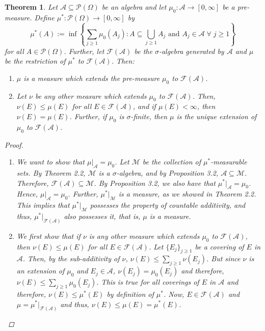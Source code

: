 \documentclass{article}
\newcommand{\A}{\mathscr{A}}
\newcommand{\Po}{\mathscr{P}}
\newcommand{\F}{\mathscr{F}}
\newcommand{\M}{\mathcal{M}}
\theoremstyle{spaced}
\newtheorem{theorem}{Theorem}[section]
\begin{document}
\begin{theorem}
    Let $\A \subseteq \Po(\Omega)$ be an algebra and let $\mu_0: \A \to [0, \infty]$ be a pre-measure. Define $\mu^*: \Po(\Omega) \to [0, \infty]$ by
    \begin{equation*}
        \mu^*(A) := \inf\left\{ \sum_{j\geq 1} \mu_0(A_j) : A \subseteq \bigcup_{j \geq 1} A_j \text{ and } A_j \in \A \; \forall \; j \geq 1 \right\}
    \end{equation*}
    for all $A \in \Po(\Omega)$. Further, let $\F(\A)$ be the $\sigma$-algebra generated by $\A$ and $\mu$ be the restriction of $\mu^*$ to $\F(\A)$. Then:
    \begin{enumerate}
        \item $\mu$ is a measure which extends the pre-measure $\mu_0$ to $\F(\A)$.
        \item Let $\nu$ be any other measure which extends $\mu_0$ to $\F(\A)$. Then, $\nu(E) \leq \mu(E)$ for all $E \in \F(\A)$, and if $\mu(E) < \infty$, then $\nu(E) = \mu(E)$. Further, if $\mu_0$ is $\sigma$-finite, then $\mu$ is the unique extension of $\mu_0$ to $\F(\A)$.
    \end{enumerate}

    \begin{proof}
        \begin{enumerate}
            \item We want to show that $\mu|_{\A} = \mu_0$. Let $\M$ be the collection of $\mu^*$-measurable sets. By Theorem 2.2, $\M$ is a $\sigma$-algebra, and by Proposition 3.2, $\A \subseteq \M$. Therefore, $\F(\A) \subseteq \M$. By Proposition 3.2, we also have that $\mu^*|_{\A} = \mu_0$. Hence, $\mu|_{\A} = \mu_0$. Further, $\mu^*|_{\M}$ is a measure, as we showed in Theorem 2.2. This implies that $\mu^*|_{\M}$ possesses the property of countable additivity, and thus, $\mu^*|_{\F(\A)}$ also possesses it, that is, $\mu$ is a measure. 

            \item We first show that if $\nu$ is any other measure which extends $\mu_0$ to $\F(\A)$, then $\nu(E) \leq \mu(E)$ for all $E \in \F(\A)$. Let $\{E_j\}_{j \geq 1}$ be a covering of $E$ in $\A$. Then, by the sub-additivity of $\nu$, $\nu(E) \leq \sum_{j \geq 1} \nu(E_j)$. But since $\nu$ is an extension of $\mu_0$ and $E_j \in \A$, $\nu(E_j) = \mu_0(E_j)$ and therefore, $\nu(E) \leq \sum_{j \geq 1} \mu_0(E_j)$. This is true for all coverings of $E$ in $\A$ and therefore, $\nu(E) \leq \mu^*(E)$ by definition of $\mu^*$. Now, $E \in \F(\A)$ and $\mu = \mu^*|_{\F(\A)}$ and thus, $\nu(E) \leq \mu(E) = \mu^*(E)$. 


\end{enumerate}
\end{proof}
\end{theorem}
\end{document}
